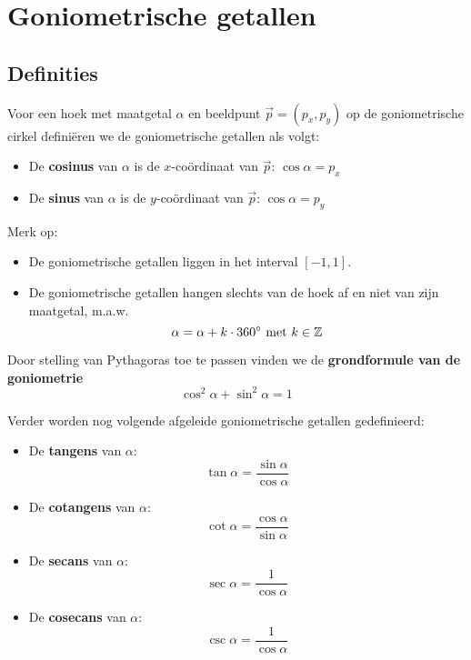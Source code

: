 \documentclass[a4paper,12pt]{article}
\begin{document}
\onehalfspacing

\section{Goniometrische getallen}

\begin{theorie}

\subsection{Definities}

Voor een hoek met maatgetal $\alpha$ en beeldpunt $\vec{p}=(p_x,p_y)$ op de goniometrische cirkel definiëren we de goniometrische getallen als volgt:

\begin{itemize}
  \item De {\bf cosinus} van $\alpha$ is de $x$-coördinaat van $\vec{p}$: $\cos\alpha=p_x$
  \item De {\bf sinus} van $\alpha$ is de $y$-coördinaat van $\vec{p}$: $\cos\alpha=p_y$
\end{itemize}

Merk op:
\begin{itemize}
  \item De goniometrische getallen liggen in het interval $[-1,1]$.
  \item De goniometrische getallen hangen slechts van de hoek af en niet van zijn maatgetal, m.a.w.
  $$\alpha = \alpha + k\cdot 360^\circ\mbox{ met }k\in\mathbb{Z}$$
\end{itemize}

Door stelling van Pythagoras toe te passen vinden we de {\bf grondformule van de goniometrie}
$$\cos^2\alpha + \sin^2\alpha = 1$$

Verder worden nog volgende afgeleide goniometrische getallen gedefinieerd:
\begin{itemize}
  \item De {\bf tangens} van $\alpha$:
  $$\tan\alpha=\dfrac{\sin\alpha}{\cos\alpha}$$
  \item De {\bf cotangens} van $\alpha$:
  $$\cot\alpha=\dfrac{\cos\alpha}{\sin\alpha}$$
  \item De {\bf secans} van $\alpha$:
  $$\sec\alpha=\dfrac{1}{\cos\alpha}$$
  \item De {\bf cosecans} van $\alpha$:
  $$\csc\alpha=\dfrac{1}{\cos\alpha}$$
\end{itemize}

\end{theorie}
\end{document}
